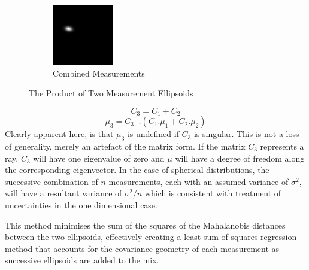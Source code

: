 \documentclass[a4paper, 11pt, titlepage]{article}
\begin{document}
\begin{figure}
      \begin{subfigure}{.3\textwidth}
        \centering
        \includegraphics[width=.8\linewidth]{images/GaussianLine3.png}
        \caption{Combined Measurements}
        \label{fig:uncProdsub3}
      \end{subfigure}
      \caption{The Product of Two Measurement Ellipsoids}
      \label{fig:uncProd}
      \end{figure}

      \begin{equation}
      C_3 = C_1+C_2
      \end{equation}
      \begin{equation}
      \mu_3 = C_3^{-1} . (C_1.\mu_1 + C_2.\mu_2)
      \end{equation}
      Clearly apparent here, is that \(\mu_3\) is undefined if \(C_3\) is singular.
      This is not a loss of generality, merely an artefact of the matrix form.  If the matrix \(C_3\) represents a ray, \(C_3\)  will have one eigenvalue of zero and \(\mu\) will have a degree of freedom along the corresponding eigenvector.
      In the case of spherical distributions, the successive combination of \(n\) measurements, each with an assumed variance of \(\sigma^2\), will have a resultant variance of \(\sigma^2/n\) which is consistent with treatment of uncertainties in the one dimensional case.
      
      This method minimises the sum of the squares of the Mahalanobis distances between the two ellipsoids, effectively creating a least sum of squares regression method that accounts for the covariance geometry of each measurement as successive ellipsoids are added to the mix.
\end{document}

